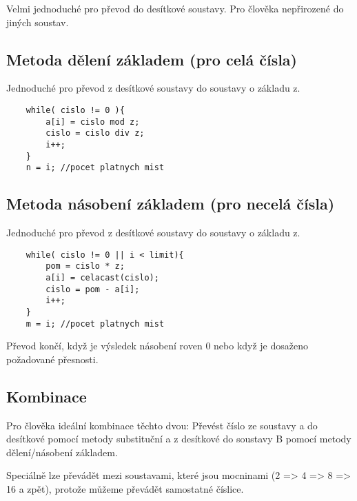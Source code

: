\documentclass[a4paper, 11pt]{report}
\begin{document}
Velmi jednoduché pro převod do desítkové soustavy. Pro člověka nepřirozené do jiných soustav.

\subsection{Metoda dělení základem (pro celá čísla)}

Jednoduché pro převod z desítkové soustavy do soustavy o základu z.

\begin{lstlisting}
	while( cislo != 0 ){
		a[i] = cislo mod z;
		cislo = cislo div z;
		i++;
	}
	n = i; //pocet platnych mist
\end{lstlisting}

\subsection{Metoda násobení základem (pro necelá čísla)}

Jednoduché pro převod z desítkové soustavy do soustavy o základu z.

\begin{lstlisting}
	while( cislo != 0 || i < limit){
		pom = cislo * z;
		a[i] = celacast(cislo);
		cislo = pom - a[i];
		i++;
	}
	m = i; //pocet platnych mist
\end{lstlisting}

Převod končí, když je výsledek násobení roven 0 nebo když je dosaženo požadované přesnosti.

\subsection{Kombinace}

Pro člověka ideální kombinace těchto dvou: Převést číslo ze soustavy a do desítkové pomocí metody substituční a z desítkové do soustavy B pomocí metody dělení/násobení základem.

Speciálně lze převádět mezi soustavami, které jsou mocninami (2 => 4 => 8 => 16 a zpět), protože můžeme převádět samostatné číslice.
\end{document}
